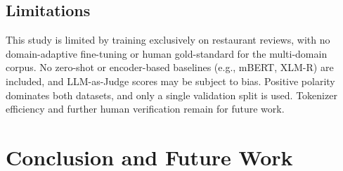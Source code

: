 \documentclass[runningheads]{llncs}
\begin{document}
\subsection{Limitations}
\label{sec:disc_limitations}
This study is limited by training exclusively on restaurant reviews, with no domain-adaptive fine-tuning or human gold-standard for the multi-domain corpus. No zero-shot or encoder-based baselines (e.g., mBERT, XLM-R) are included, and LLM-as-Judge scores may be subject to bias. Positive polarity dominates both datasets, and only a single validation split is used. Tokenizer efficiency and further human verification remain for future work.


\section{Conclusion and Future Work}
\label{sec:conclusion}


\end{document}
